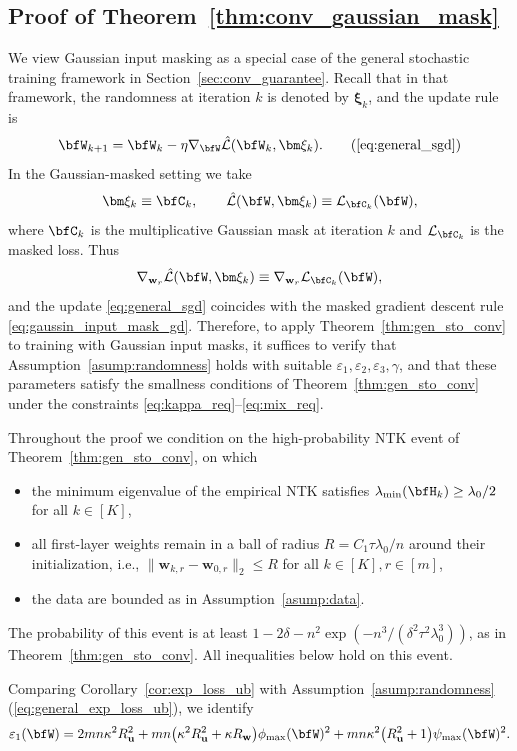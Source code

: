 \documentclass[10pt]{article} %
\theoremstyle{definition}
\theoremstyle{plain}
\def\calL{{\mathcal{L}}}
\def\bfu{{\mathbf{u}}}\def\bfv{{\mathbf{v}}}\def\bfw{{\mathbf{w}}}\def\bfx{{\mathbf{x}}}
\begin{document}
\subsection{Proof of Theorem~\ref{thm:conv_gaussian_mask}}
\label{sec:proof_conv_form}
We view Gaussian input masking as a special case of the general stochastic
training framework in Section~\ref{sec:conv_guarantee}.  Recall that in that
framework, the randomness at iteration $k$ is denoted by $\bm\xi_k$, and the
update rule is
\[
\bfW_{k+1} = \bfW_k - \eta \nabla_{\bfW}\hat{\calL}(\bfW_k,\bm\xi_k).
\tag{\ref{eq:general_sgd}}
\]
In the Gaussian-masked setting we take
\[
\bm\xi_k \equiv \bfC_k, \qquad
\hat{\calL}(\bfW,\bm\xi_k) \equiv \calL_{\bfC_k}(\bfW),
\]
where $\bfC_k$ is the multiplicative Gaussian mask at iteration $k$ and
$\calL_{\bfC_k}$ is the masked loss.  Thus
\[
\nabla_{\bfw_r}\hat{\calL}(\bfW,\bm\xi_k)
\equiv
\nabla_{\bfw_r}\calL_{\bfC_k}(\bfW),
\]
and the update \eqref{eq:general_sgd} coincides with the masked gradient
descent rule \eqref{eq:gaussin_input_mask_gd}.  Therefore, to apply
Theorem~\ref{thm:gen_sto_conv} to training with Gaussian input masks, it
suffices to verify that Assumption~\ref{asump:randomness} holds with suitable
$\varepsilon_1,\varepsilon_2,\varepsilon_3,\gamma$, and that these parameters
satisfy the smallness conditions of Theorem~\ref{thm:gen_sto_conv} under the
constraints \eqref{eq:kappa_req}–\eqref{eq:mix_req}.

Throughout the proof we condition on the high-probability NTK event of
Theorem~\ref{thm:gen_sto_conv}, on which
\begin{itemize}[leftmargin=*]
  \item the minimum eigenvalue of the empirical NTK satisfies
  $\lambda_{\min}(\bfH_k)\ge \lambda_0/2$ for all $k\in[K]$,
  \item all first-layer weights remain in a ball of radius
  $R = C_1\tau\lambda_0/n$ around their initialization, i.e.,
  $\|\bfw_{k,r}-\bfw_{0,r}\|_2\le R$ for all $k\in[K],r\in[m]$,
  \item the data are bounded as in Assumption~\ref{asump:data}.
\end{itemize}
The probability of this event is at least
$1 - 2\delta - n^2\exp(-n^3/(\delta^2\tau^2\lambda_0^3))$, as in
Theorem~\ref{thm:gen_sto_conv}. All inequalities below hold on this event.

Comparing Corollary~\ref{cor:exp_loss_ub} with
Assumption~\ref{asump:randomness}(\ref{eq:general_exp_loss_ub}), we identify
\begin{equation}
\label{eq:eps1_exact}
    \varepsilon_1(\bfW)
    =
    2mn\kappa^2R_{\bfu}^2
     + 
    mn\big(\kappa^2R_{\bfu}^2 + \kappa R_{\bfw}\big)\phi_{\max}(\bfW)^2
     + 
    mn\kappa^2\big(R_{\bfu}^2+1\big)\psi_{\max}(\bfW)^2.
\end{equation}
\end{document}
